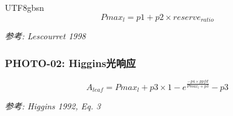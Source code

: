 \documentclass{article}
\begin{document}
\begin{CJK}{UTF8}{gbsn}
\begin{equation}
    Pmax_{l} = p1 + p2 \times reserve_{ratio}
\end{equation}

\textit{参考: Lescourret 1998}

\subsubsection{PHOTO-02: Higgins光响应}

\begin{equation}
    A_{leaf} = Pmax_{l} + p3 \times 1 - e^{\frac{-p4 \times ppfd}{Pmax_{l} + p3}} - p3
\end{equation}

\textit{参考: Higgins 1992, Eq. 3}

\end{CJK}
\end{document}
